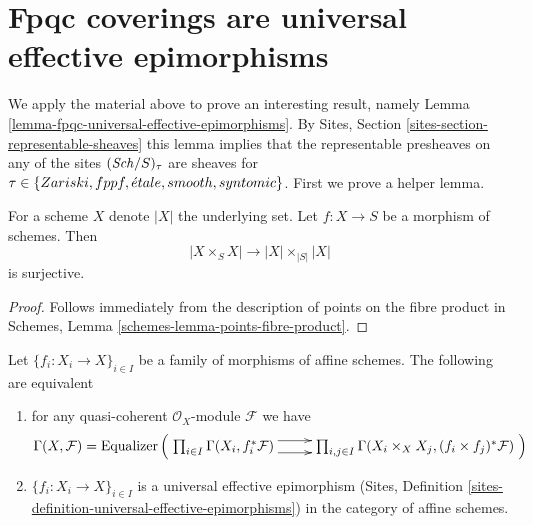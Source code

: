 \section{Fpqc coverings are universal effective epimorphisms}
\label{section-fpqc-universal-effective-epimorphisms}

\noindent
We apply the material above to prove an interesting result, namely
Lemma \ref{lemma-fpqc-universal-effective-epimorphisms}.
By Sites, Section \ref{sites-section-representable-sheaves}
this lemma implies that the representable
presheaves on any of the sites $(\mathit{Sch}/S)_\tau$ are sheaves for
$\tau \in \{Zariski, fppf, {\acute{e}tale}, smooth, syntomic\}$. First
we prove a helper lemma.

\begin{lemma}
\label{lemma-equiv-fibre-product}
For a scheme $X$ denote $|X|$ the underlying set.
Let $f : X \to S$ be a morphism of schemes.
Then
$$
|X \times_S X| \to |X| \times_{|S|} |X|
$$
is surjective.
\end{lemma}

\begin{proof}
Follows immediately from the description of points on the
fibre product in Schemes, Lemma \ref{schemes-lemma-points-fibre-product}.
\end{proof}


\begin{lemma}
\label{lemma-universal-effective-epimorphism-affine}
Let $\{f_i : X_i \to X\}_{i \in I}$ be a family of morphisms of affine schemes.
The following are equivalent
\begin{enumerate}
\item for any quasi-coherent $\mathcal{O}_X$-module $\mathcal{F}$ we have
$$
\Gamma(X, \mathcal{F}) =
\text{Equalizer}\left(
\xymatrix{
\prod\nolimits_{i \in I} \Gamma(X_i, f_i^*\mathcal{F})
\ar@<1ex>[r] \ar@<-1ex>[r] &
\prod\nolimits_{i, j \in I}
\Gamma(X_i \times_X X_j, (f_i \times f_j)^*\mathcal{F})
}
\right)
$$
\item $\{f_i : X_i \to X\}_{i \in I}$ is a universal effective epimorphism
(Sites, Definition \ref{sites-definition-universal-effective-epimorphisms})
in the category of affine schemes.
\end{enumerate}
\end{lemma}

